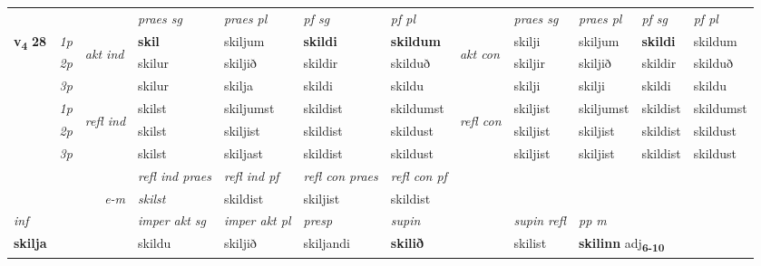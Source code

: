 \begin{longtable}[l]{X>{\footnotesize\itshape}llXXXXlXXXX}
 & &   & \textit{praes sg}  & \textit{praes pl}    & \textit{ pf sg} & \textit{pf pl} & & \textit{praes sg}  & \textit{praes pl}    & \textit{pf sg} & \textit{pf pl }  \\ \cmidrule{4-7} \cmidrule{9-12}
 \multirow{2}{*}{{{\textbf{v{\textsubscript{4}}} \Large{\textbf{28}}}}}  & 1p & \multirow{3}{*}{\begin{turn}{90}\textit{akt ind}\end{turn}} & \textbf{skil} & skiljum & \textbf{skildi} & \textbf{skildum} & \multirow{3}{*}{\begin{turn}{90}\textit{akt con}\end{turn}} &skilji & skiljum & \textbf{skildi} & skildum\\*
 & 2p &  &  skilur  & skiljið & skildir & skilduð & & skiljir & skiljið & skildir & skilduð \\*
 & 3p &  & skilur & skilja & skildi & skildu & & skilji & skilji& skildi & skildu \\*
\cmidrule{4-7} \cmidrule{9-12}
 & 1p & \multirow{3}{*}{\begin{turn}{90}\textit{refl ind}\end{turn}}  & skilst & skiljumst & skildist & skildumst & \multirow{3}{*}{\begin{turn}{90}\textit{refl con}\end{turn}}  &skiljist & skiljumst & skildist & skildumst \\*
 & 2p &  & skilst & skiljist & skildist & skildust & &skiljist & skiljist & skildist & skildust \\*
 & 3p  & & skilst & skiljast & skildist & skildust & & skiljist & skiljist& skildist & skildust \\*
\cmidrule{4-7} \cmidrule{9-12}

 & && \textit{refl ind praes} & \textit{refl ind pf} & \textit{refl con praes} & \textit{refl con pf} \\*
\multicolumn{3}{r}{\textit{e-m}}& skilst & skildist & skiljist & skildist \\*

\cmidrule{4-7}
   {\textit{inf}} & &  & \textit{imper akt sg} & \textit{imper akt pl}   & \textit{presp} & \textit{supin} && \textit{supin refl} & \textit{pp m} \\*
  {\textbf{skilja}} & && skildu  & skiljið   & skiljandi &  \textbf{skilið} && skilist & \multicolumn{2}{l}{\textbf{skilinn} adj\textbf{\textsubscript{6-10}}} \\*

\midrule


\end{longtable}
